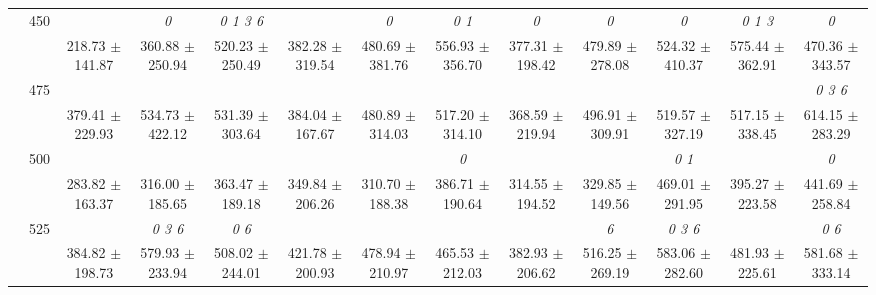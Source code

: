 \begin{table}[h]
{\begin{tabular}{
        ccccccccccccc}
 & \multirow{2}{*}{450}& & \textit{ 0 }& \textit{ 0 1 3 6 }& & \textit{ 0 }& \textit{ 0 1 }& \textit{ 0 }& \textit{ 0 }& \textit{ 0 }& \textit{ 0 1 3 }& \textit{ 0 } \\ 
 & & 218.73 $\pm$ 141.87& 360.88 $\pm$ 250.94& 520.23 $\pm$ 250.49& 382.28 $\pm$ 319.54& 480.69 $\pm$ 381.76& 556.93 $\pm$ 356.70& 377.31 $\pm$ 198.42& 479.89 $\pm$ 278.08& 524.32 $\pm$ 410.37& 575.44 $\pm$ 362.91& 470.36 $\pm$ 343.57 \\ 
 & \multirow{2}{*}{475}& \cellcolor[HTML]{EFEFEF} & \cellcolor[HTML]{EFEFEF} & \cellcolor[HTML]{EFEFEF} & \cellcolor[HTML]{EFEFEF} & \cellcolor[HTML]{EFEFEF} & \cellcolor[HTML]{EFEFEF} & \cellcolor[HTML]{EFEFEF} & \cellcolor[HTML]{EFEFEF} & \cellcolor[HTML]{EFEFEF} & \cellcolor[HTML]{EFEFEF} & \cellcolor[HTML]{EFEFEF} \textit{ 0 3 6 } \\ 
 & & \cellcolor[HTML]{EFEFEF} 379.41 $\pm$ 229.93& \cellcolor[HTML]{EFEFEF} 534.73 $\pm$ 422.12& \cellcolor[HTML]{EFEFEF} 531.39 $\pm$ 303.64& \cellcolor[HTML]{EFEFEF} 384.04 $\pm$ 167.67& \cellcolor[HTML]{EFEFEF} 480.89 $\pm$ 314.03& \cellcolor[HTML]{EFEFEF} 517.20 $\pm$ 314.10& \cellcolor[HTML]{EFEFEF} 368.59 $\pm$ 219.94& \cellcolor[HTML]{EFEFEF} 496.91 $\pm$ 309.91& \cellcolor[HTML]{EFEFEF} 519.57 $\pm$ 327.19& \cellcolor[HTML]{EFEFEF} 517.15 $\pm$ 338.45& \cellcolor[HTML]{EFEFEF} 614.15 $\pm$ 283.29 \\ 
 & \multirow{2}{*}{500}& & & & & & \textit{ 0 }& & & \textit{ 0 1 }& & \textit{ 0 } \\ 
 & & 283.82 $\pm$ 163.37& 316.00 $\pm$ 185.65& 363.47 $\pm$ 189.18& 349.84 $\pm$ 206.26& 310.70 $\pm$ 188.38& 386.71 $\pm$ 190.64& 314.55 $\pm$ 194.52& 329.85 $\pm$ 149.56& 469.01 $\pm$ 291.95& 395.27 $\pm$ 223.58& 441.69 $\pm$ 258.84 \\ 
 & \multirow{2}{*}{525}& \cellcolor[HTML]{EFEFEF} & \cellcolor[HTML]{EFEFEF} \textit{ 0 3 6 }& \cellcolor[HTML]{EFEFEF} \textit{ 0 6 }& \cellcolor[HTML]{EFEFEF} & \cellcolor[HTML]{EFEFEF} & \cellcolor[HTML]{EFEFEF} & \cellcolor[HTML]{EFEFEF} & \cellcolor[HTML]{EFEFEF} \textit{ 6 }& \cellcolor[HTML]{EFEFEF} \textit{ 0 3 6 }& \cellcolor[HTML]{EFEFEF} & \cellcolor[HTML]{EFEFEF} \textit{ 0 6 } \\ 
 & & \cellcolor[HTML]{EFEFEF} 384.82 $\pm$ 198.73& \cellcolor[HTML]{EFEFEF} 579.93 $\pm$ 233.94& \cellcolor[HTML]{EFEFEF} 508.02 $\pm$ 244.01& \cellcolor[HTML]{EFEFEF} 421.78 $\pm$ 200.93& \cellcolor[HTML]{EFEFEF} 478.94 $\pm$ 210.97& \cellcolor[HTML]{EFEFEF} 465.53 $\pm$ 212.03& \cellcolor[HTML]{EFEFEF} 382.93 $\pm$ 206.62& \cellcolor[HTML]{EFEFEF} 516.25 $\pm$ 269.19& \cellcolor[HTML]{EFEFEF} 583.06 $\pm$ 282.60& \cellcolor[HTML]{EFEFEF} 481.93 $\pm$ 225.61& \cellcolor[HTML]{EFEFEF} 581.68 $\pm$ 333.14 \\ 

\end{tabular}}
\end{table}
